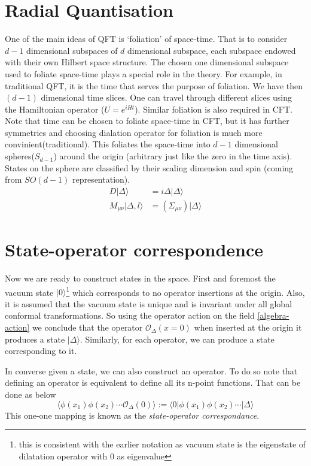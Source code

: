 \documentclass[12pt,a4paper,oneside]{book}
\theoremstyle{definition}
\begin{document}
    \section{Radial Quantisation}
    One of the main ideas of QFT is  `foliation' of space-time. That is to consider $d-1$ dimensional subspaces of $d$ dimensional subspace, each subspace endowed with their own Hilbert space structure. The chosen one  dimensional subspace  used to foliate space-time plays a special role in the theory. For example, in traditional QFT, it is the time that serves the purpose of foliation. We have then $(d-1)$ dimensional time slices. One can travel through different slices using the Hamiltonian operator ($U = e^{iHt}$). Similar foliation is also required in CFT. Note that time can be chosen to foliate space-time in CFT, but it has further symmetries and choosing dialation operator for foliation is much more convinient(traditional). This foliates the space-time into $d-1$ dimensional spheres($S_{d-1}$) around the origin (arbitrary just like the zero in the time axis). States on the sphere are classified by their scaling dimension and spin (coming from $SO(d-1)$ representation).
    \begin{subequations}
    \begin{align}
        D|\Delta\rangle &= i\Delta|\Delta\rangle\\
        M_{\mu\nu} |\Delta,l\rangle &= \left(\Sigma_{\mu\nu}\right)|\Delta\rangle
    \end{align}
\end{subequations}
    \section{State-operator correspondence}
    Now we are ready to construct states in the space. First and foremost the vacuum state $|0\rangle$\footnote{this is consistent with the earlier notation as vacuum state is the eigenstate of dilatation operator with 0 as eigenvalue} which corresponds to no operator insertions at the origin. Also, it is assumed that the vacuum state is unique and is invariant under all global conformal transformations. So using the operator action on the field \ref{algebra-action} we conclude that the operator $\mathcal{O}_{\Delta}(x=0)$ when inserted at the origin it produces a state $|\Delta\rangle$. Similarly, for each operator, we can produce a state corresponding to it. 
    \par
    In converse given a state, we can also construct an operator. To do so note that defining an operator is equivalent to define all its n-point functions. That can be done as below
    \begin{equation}
        \langle\phi (x_{1}) \phi(x_{2})\cdots\mathcal{O}_{\Delta}(0)\rangle := \langle 0|\phi(x_1)\phi(x_2)\cdots |\Delta\rangle
    \end{equation}
    This one-one mapping is known as the \emph{state-operator correspondance}.
\end{document}
